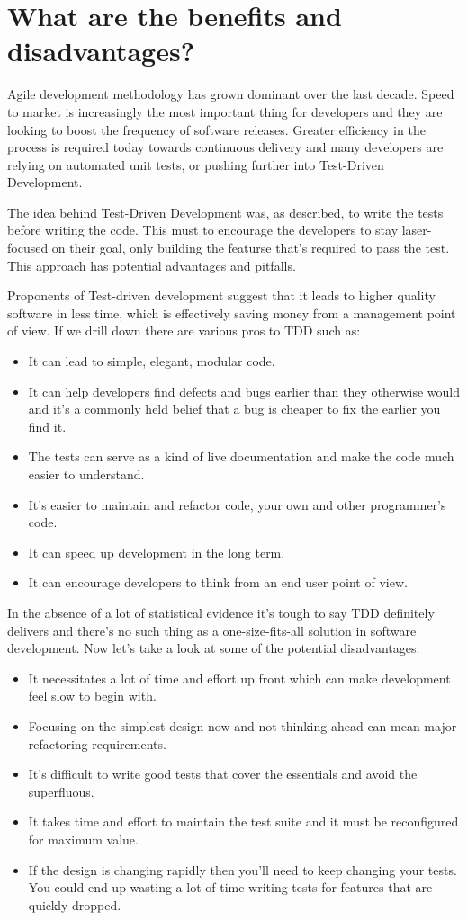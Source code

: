 \documentclass[11pt]{article}
\begin{document}
\section{What are the benefits and disadvantages?}
Agile development methodology has grown dominant over the last decade. Speed to market is increasingly the most important thing for developers and they are looking to boost the frequency of software releases. Greater efficiency in the process is required today towards continuous delivery and many developers are relying on automated unit tests, or pushing further into Test-Driven Development.

The idea behind Test-Driven Development was, as described, to write the tests before writing the code. This must to encourage the developers to stay laser-focused on their goal, only building the featurse that’s required to pass the test. This approach has potential advantages and pitfalls.

Proponents of Test-driven development suggest that it leads to higher quality software in less time, which is effectively saving money from a management point of view. If we drill down there are various pros to TDD such as:
\begin{itemize}
\item It can lead to simple, elegant, modular code.
\item It can help developers find defects and bugs earlier than they otherwise would and it’s a commonly held belief that a bug is cheaper to fix the earlier you find it.
\item The tests can serve as a kind of live documentation and make the code much easier to understand.
\item It’s easier to maintain and refactor code, your own and other programmer’s code.
\item It can speed up development in the long term.
\item It can encourage developers to think from an end user point of view.
\end{itemize}
In the absence of a lot of statistical evidence it’s tough to say TDD definitely delivers and there’s no such thing as a one-size-fits-all solution in software development. Now let’s take a look at some of the potential disadvantages:
\begin{itemize}
\item It necessitates a lot of time and effort up front which can make development feel slow to begin with.
\item Focusing on the simplest design now and not thinking ahead can mean major refactoring requirements.
\item It’s difficult to write good tests that cover the essentials and avoid the superfluous.
\item It takes time and effort to maintain the test suite and it must be reconfigured for maximum value.
\item If the design is changing rapidly then you’ll need to keep changing your tests. You could end up wasting a lot of time writing tests for features that are quickly dropped.
\end{itemize}
\end{document}
